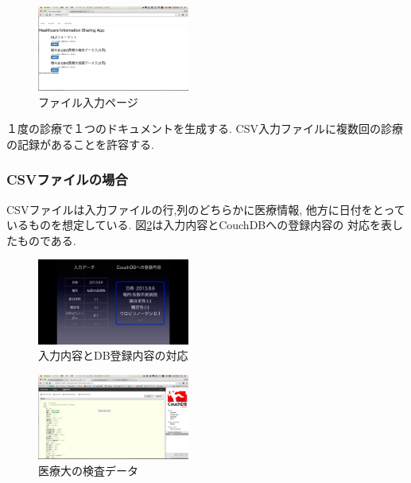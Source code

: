 	\begin{figure}[htbp]
			\includegraphics[width=5cm, bb=0 0 437 688]{./gazou/fileiopage.png}
		\caption{ファイル入力ページ}
		\label{fileiopage}
	\end{figure}

	１度の診療で１つのドキュメントを生成する.
	CSV入力ファイルに複数回の診療の記録があることを許容する.

		\subsubsection{CSVファイルの場合}
			CSVファイルは入力ファイルの行,列のどちらかに医療情報,
			他方に日付をとっているものを想定している.
			図\ref{csv-data-trans}は入力内容とCouchDBへの登録内容の
			対応を表したものである.

			\begin{figure}[htbp]
					\includegraphics[width=5cm, bb=0 0 437 688]{./gazou/csv-data-trans.png}
				\caption{入力内容とDB登録内容の対応}
				\label{csv-data-trans}
			\end{figure}

			\begin{figure}[htbp]
					\includegraphics[width=5cm, bb=0 0 437 688]{./gazou/kensa.png}
				\caption{医療大の検査データ}
				\label{iryoudai-kensa-data}
			\end{figure}

